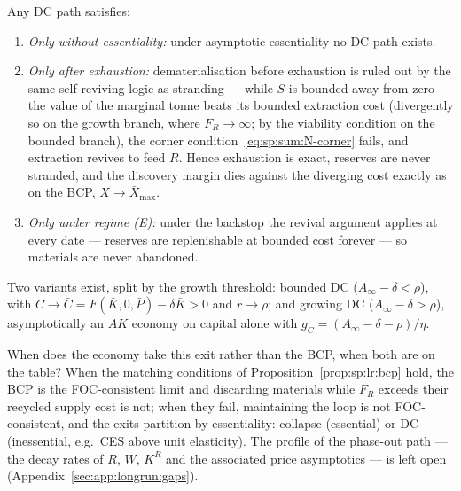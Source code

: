 \begin{proposition}[Placement of DC]\label{prop:sp:lr:dc}
Any DC path satisfies:
\begin{enumerate}
    \item \emph{Only without essentiality:} under asymptotic essentiality no DC path exists.
    \item \emph{Only after exhaustion:} dematerialisation before exhaustion is ruled out by the
    same self-reviving logic as stranding --- while $S$ is bounded away from zero the value of
    the marginal tonne beats its bounded extraction cost (divergently so on the growth branch,
    where $F_R\to\infty$; by the viability condition on the bounded branch), the corner
    condition~\eqref{eq:sp:sum:N-corner} fails, and extraction revives to feed $R$. Hence
    exhaustion is exact, reserves are never stranded, and the discovery margin dies against the
    diverging cost exactly as on the BCP, $X\to\bar X_{\max}$.
    \item \emph{Only under regime (E):} under the backstop the revival argument applies at every
    date --- reserves are replenishable at bounded cost forever --- so materials are never
    abandoned.
\end{enumerate}
Two variants exist, split by the growth threshold: bounded DC ($A_\infty-\delta<\rho$), with
$C\to\bar C=F\left(\bar K,0,\bar P\right)-\delta\bar K>0$ and $r\to\rho$; and growing DC
($A_\infty-\delta>\rho$), asymptotically an $AK$ economy on capital alone with
$g_C=\left(A_\infty-\delta-\rho\right)/\eta$.
\end{proposition}

When does the economy take this exit rather than the BCP, when both are on the table? When the
matching conditions of Proposition~\ref{prop:sp:lr:bcp} hold, the BCP is the FOC-consistent
limit and discarding materials while $F_R$ exceeds their recycled supply cost is not; when they
fail, maintaining the loop is not FOC-consistent, and the exits partition by essentiality:
collapse (essential) or DC (inessential, e.g.\ CES above unit elasticity). The profile of the
phase-out path --- the decay rates of $R$, $W$, $K^R$ and the associated price asymptotics ---
is left open (Appendix~\ref{sec:app:longrun:gaps}).


